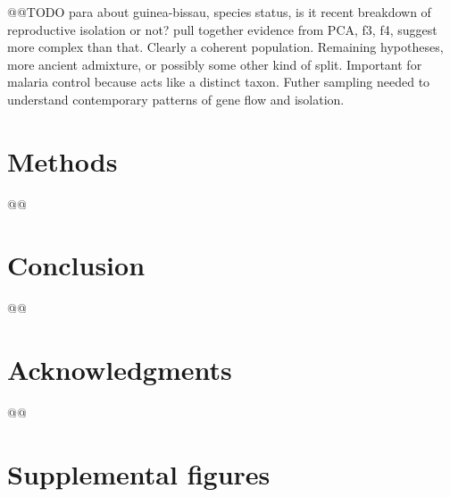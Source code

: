 \documentclass[a4paper,11pt,abstracton,hidelinks]{scrartcl}
\begin{document}
@@TODO para about guinea-bissau, species status, is it recent breakdown of reproductive isolation or not? pull together evidence from PCA, f3, f4, suggest more complex than that. Clearly a coherent population. Remaining hypotheses, more ancient admixture, or possibly some other kind of split. Important for malaria control because acts like a distinct taxon. Futher sampling needed to understand contemporary patterns of gene flow and isolation.


\section{Methods}\label{sec:methods}


@@


\section{Conclusion}\label{sec:conclusion}


@@


\section{Acknowledgments}\label{sec:acknowledgments}


@@


\printbibliography


\clearpage
\beginsupplement
\section{Supplemental figures}\label{sec:supplemental-figures}
\end{document}
